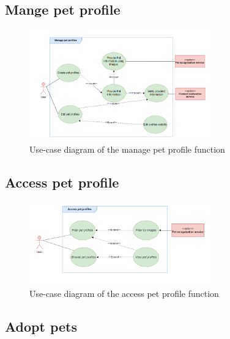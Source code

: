 

\subsection{Mange pet profile}

\begin {figure}[H]
\centering
\includegraphics[width=0.7\textwidth]{Figures/manage_pet_ucd.png}
\caption{Use-case diagram of the manage pet profile function}
\label{fig:manage-pet-activity-diagram}
\end{figure}



\subsection{Access pet profile}

\begin {figure}[H]
\centering
\includegraphics[width=0.7\textwidth]{Figures/access_pet_ucd.png}
\caption{Use-case diagram of the access pet profile function}
\label{fig:access-pet-activity-diagram}
\end{figure}



\subsection{Adopt pets}


